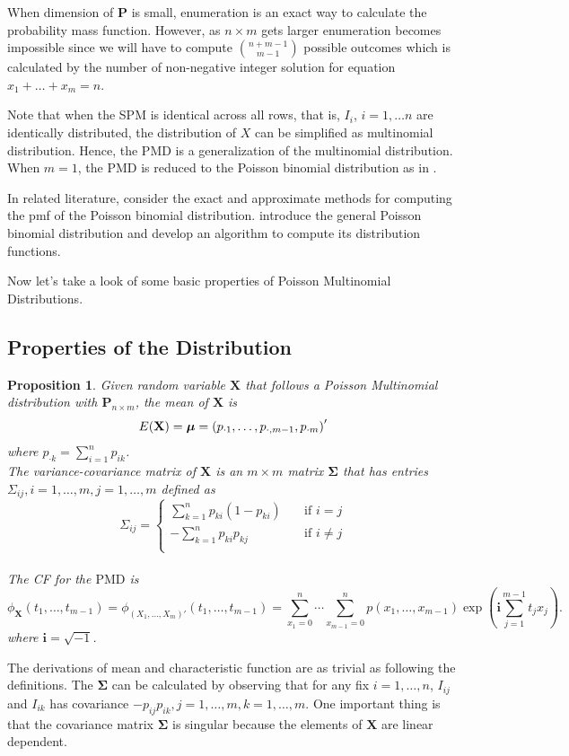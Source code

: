\documentclass[12pt]{article}
\newcommand{\Xmat}{\mathbf{X}}
\newcommand{\Pmat}{\mathbf{P}}
\newcommand{\ivec}{{\boldsymbol{i}}}
\newcommand{\PMD}{\textrm{PMD}}
\newcommand{\Xvec}{\boldsymbol{X}}
\newcommand{\muvec}{\boldsymbol{\mu}}
\newcommand{\Sig}{\boldsymbol{\Sigma}}
\newcommand{\qedw}{\hfill \ensuremath{\Box}}
\newtheorem{ppt}{Proposition}
\begin{document}
When dimension of $\Pmat$ is small, enumeration is an exact way to calculate the probability mass function. However, as $n \times m$ gets larger enumeration becomes impossible since we will have to compute $\binom{n+m-1}{m-1}$ possible outcomes which is calculated by the number of non-negative integer solution for equation $x_1 + \dots + x_m = n$.


Note that when the SPM is identical across all rows, that is, $I_{i}$, $i = 1, \dots n$ are identically distributed, the distribution of $X$ can be simplified as multinomial distribution. Hence, the $\PMD$ is a generalization of the multinomial distribution. When $m=1$, the $\PMD$ is reduced to the Poisson binomial distribution as in .

In related literature,  consider the exact and approximate methods for computing the pmf of the Poisson binomial distribution.  introduce the general Poisson binomial distribution and develop an algorithm to compute its distribution functions.

Now let's take a look of some basic properties of Poisson Multinomial Distributions.

\subsection{Properties of the Distribution}
\begin{ppt}%
Given random variable $\Xmat$ that follows a Poisson Multinomial distribution with $\Pmat_{n\times m}$, the mean of $\Xmat$ is
   $$\\E(\Xmat) = \muvec = \left( p_{\cdot1} ,\dots,p_{\cdot,m-1},p_{\cdot m}\right)'$$ where $p_{\cdot k} = \sum_{i=1}^{n}p_{i k}$.\\
The variance-covariance matrix of $\Xmat$ is an $m \times m$ matrix $\Sig$ that has entries $\Sigma_{ij},i=1,\dots,m,j=1,\dots,m$ defined as
\begin{equation*}
   \Sigma_{ij} =
           \begin{cases}
             \sum_{k=1}^{n}p_{ki}(1-p_{ki}) & \quad \text{if } i=j\\
             -\sum_{k=1}^{n}p_{ki}p_{kj} & \quad \text{if } i \neq j\\
           \end{cases}
\end{equation*}\\
The CF for the $\PMD$ is
\begin{equation*}
\phi_{\Xmat}(t_1, \dots, t_{m-1}) = \phi_{(X_1,\dots,X_m)'}(t_1, \dots, t_{m-1})  =  \sum_{x_1 = 0}^{n} \cdots \sum_{x_{m-1} = 0}^n p(x_1,\ldots,x_{m-1})\exp\left(\ivec\sum_{j=1}^{m-1}t_jx_j\right).
\end{equation*}
where  $\ivec=\sqrt{-1}$.
\end{ppt}
The derivations of mean and characteristic function are as trivial as following the definitions. The $\Sig$ can be calculated by observing that for any fix $i=1,\dots,n$, $I_{ij}$ and $I_{ik}$ has covariance $-p_{ij}p_{ik},j=1,\dots,m,k=1,\dots,m$. One important thing is that the covariance matrix $\Sig$ is singular because the elements of $\Xvec$ are linear dependent.
\end{document}
